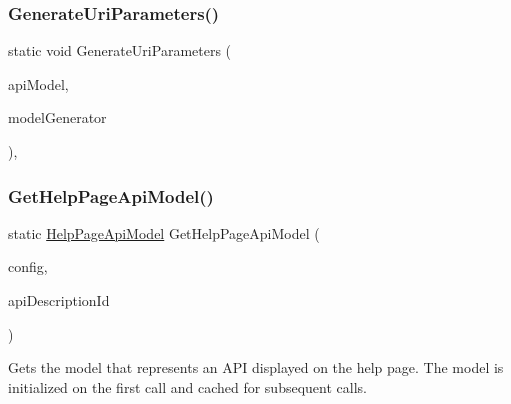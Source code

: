 \subsubsection{\texorpdfstring{Generate\+Uri\+Parameters()}{GenerateUriParameters()}}
{\footnotesize\ttfamily static void Generate\+Uri\+Parameters (\begin{DoxyParamCaption}\item[{\hyperlink{classApi3Layers_1_1Areas_1_1HelpPage_1_1Models_1_1HelpPageApiModel}{Help\+Page\+Api\+Model}}]{api\+Model,  }\item[{\hyperlink{classApi3Layers_1_1Areas_1_1HelpPage_1_1ModelDescriptions_1_1ModelDescriptionGenerator}{Model\+Description\+Generator}}]{model\+Generator }\end{DoxyParamCaption})\hspace{0.3cm}{\ttfamily [static]}, {\ttfamily [private]}}

\mbox{\label{classApi3Layers_1_1Areas_1_1HelpPage_1_1HelpPageConfigurationExtensions_a8e1dd06343ebfd465042fb7fde291909}} 
\subsubsection{\texorpdfstring{Get\+Help\+Page\+Api\+Model()}{GetHelpPageApiModel()}}
{\footnotesize\ttfamily static \hyperlink{classApi3Layers_1_1Areas_1_1HelpPage_1_1Models_1_1HelpPageApiModel}{Help\+Page\+Api\+Model} Get\+Help\+Page\+Api\+Model (\begin{DoxyParamCaption}\item[{this Http\+Configuration}]{config,  }\item[{string}]{api\+Description\+Id }\end{DoxyParamCaption})\hspace{0.3cm}{\ttfamily [static]}}



Gets the model that represents an A\+PI displayed on the help page. The model is initialized on the first call and cached for subsequent calls. 


